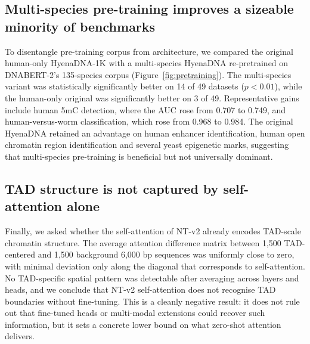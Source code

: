\documentclass[11pt,a4paper]{article}
\begin{document}
\subsection{Multi-species pre-training improves a sizeable minority of benchmarks}
To disentangle pre-training corpus from architecture, we compared the original human-only HyenaDNA-1K with a multi-species HyenaDNA re-pretrained on DNABERT-2's 135-species corpus (Figure~\ref{fig:pretraining}). The multi-species variant was statistically significantly better on 14 of 49 datasets ($p < 0.01$), while the human-only original was significantly better on 3 of 49. Representative gains include human 5mC detection, where the AUC rose from 0.707 to 0.749, and human-versus-worm classification, which rose from 0.968 to 0.984. The original HyenaDNA retained an advantage on human enhancer identification, human open chromatin region identification and several yeast epigenetic marks, suggesting that multi-species pre-training is beneficial but not universally dominant.

\subsection{TAD structure is not captured by self-attention alone}
Finally, we asked whether the self-attention of NT-v2 already encodes TAD-scale chromatin structure. The average attention difference matrix between 1{,}500 TAD-centered and 1{,}500 background 6{,}000 bp sequences was uniformly close to zero, with minimal deviation only along the diagonal that corresponds to self-attention. No TAD-specific spatial pattern was detectable after averaging across layers and heads, and we conclude that NT-v2 self-attention does not recognise TAD boundaries without fine-tuning. This is a cleanly negative result: it does not rule out that fine-tuned heads or multi-modal extensions could recover such information, but it sets a concrete lower bound on what zero-shot attention delivers.
\end{document}
